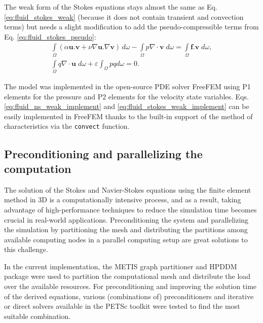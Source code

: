 The weak form of the Stokes equations stays almost the same as Eq. \ref{eq:fluid_stokes_weak} (because it does not contain transient and convection terms) but needs a slight modification to add the pseudo-compressible terms from Eq. \ref{eq:fluid_stokes_pseudo}:
\begin{equation} \label{eq:fluid_stokes_weak_implement}
\begin{array}{*{20}{l}}
\displaystyle  {\int\limits_\Omega  {(\alpha {\mathbf{u}}.{\mathbf{v}} + \nu\nabla {\mathbf{u}}.\nabla {\mathbf{v}})\,} d\omega  - \int\limits_\Omega  {p\nabla\cdot{\mathbf{v}}\;d\omega  = } \int\limits_\Omega  {{\mathbf{f}}.{\mathbf{v}}\;d\omega,} } \\
\displaystyle  {\int\limits_\Omega  {q\nabla\cdot{\mathbf{u}}\;d\omega +\varepsilon \int_{\Omega} p q d \omega  = 0}.}
\end{array}
\end{equation}

The model was implemented in the open-source {PDE} solver FreeFEM \cite{Hecht2012} using P1 elements for the pressure and P2 elements for the velocity state variables. Eqs. \ref{eq:fluid_ns_weak_implement} and \ref{eq:fluid_stokes_weak_implement} can be easily implemented in FreeFEM thanks to the built-in support of the method of characteristics via the \verb|convect| function.


\subsection{Preconditioning and parallelizing the computation}

The solution of the Stokes and Navier-Stokes equations using the finite element method in 3D is a computationally intensive process, and as a result, taking advantage of high-performance techniques to reduce the simulation time becomes crucial in real-world applications. Preconditioning the system and parallelizing the simulation by partitioning the mesh and distributing the partitions among available computing nodes in a parallel computing setup are great solutions to this challenge.

In the current implementation, the METIS graph partitioner \cite{METIS1998} and {HPDDM} package \cite{Jolivet2013} were used to partition the computational mesh and distribute the load over the available resources. For preconditioning and improving the solution time of the derived equations, various (combinations of) preconditioners and iterative or direct solvers available in the {PETSc} toolkit \cite{petsc} were tested to find the most suitable combination.

